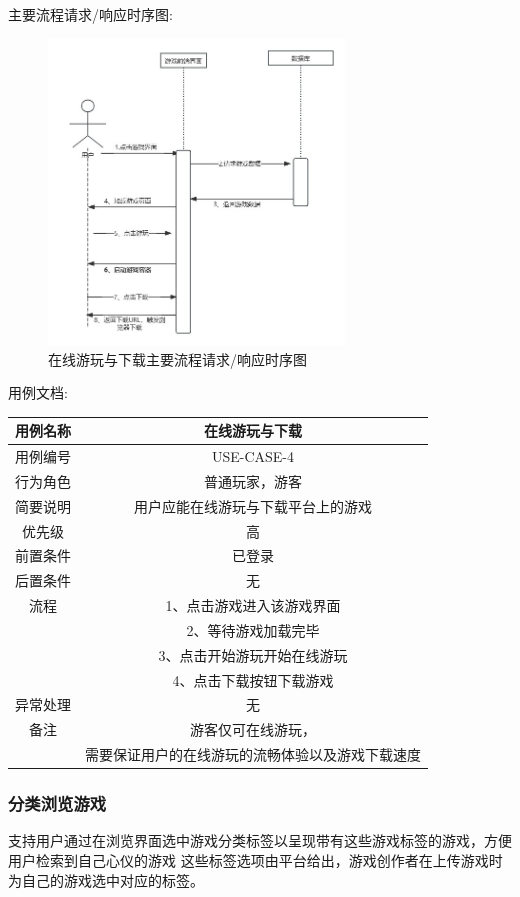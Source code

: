 \documentclass[12pt]{ctexart} %
\begin{document}
主要流程请求/响应时序图:
\begin{figure}[h]
  \centering
  \includegraphics[width=0.7\textwidth]{yongli4.jpg}
  \caption{在线游玩与下载主要流程请求/响应时序图}
\end{figure}
用例文档:

\begin{tabular}{|c|c|}
  \hline
  用例名称& 在线游玩与下载\\
  \hline
  用例编号 & USE-CASE-4\\
  \hline
  行为角色 & 普通玩家，游客\\
  \hline
  简要说明 & 用户应能在线游玩与下载平台上的游戏\\
  \hline
  优先级 & 高\\
  \hline
  前置条件 & 已登录\\
  \hline
  后置条件 & 无\\
  \hline
  流程 & 1、点击游戏进入该游戏界面\\
      &  2、等待游戏加载完毕\\
      & 3、点击开始游玩开始在线游玩\\
      & 4、点击下载按钮下载游戏\\
  \hline
  异常处理 & 无\\
  \hline
  备注 & 游客仅可在线游玩，\\
       &需要保证用户的在线游玩的流畅体验以及游戏下载速度\\
  \hline
\end{tabular}

\subsubsection{分类浏览游戏}
支持用户通过在浏览界面选中游戏分类标签以呈现带有这些游戏标签的游戏，方便用户检索到自己心仪的游戏
这些标签选项由平台给出，游戏创作者在上传游戏时为自己的游戏选中对应的标签。
\end{document}
